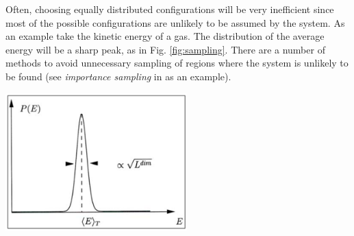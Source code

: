 \vspace{0.1cm}
\noindent
\begin{minipage}{\textwidth}
\begin{minipage}{.48\textwidth}
Often, choosing equally distributed configurations will be very inefficient since most of the possible configurations are unlikely to be assumed by the system. As an example take the kinetic energy of a gas. The distribution of the average energy will be a sharp peak, as in Fig. \ref{fig:sampling}. There are a number of methods to avoid unnecessary sampling of regions where the system is unlikely to be found (see \emph{importance sampling} in \citet{comp_phys} as an example).
\end{minipage}%
\hfill
\begin{minipage}{.48\textwidth}
  \centering
  \includegraphics[height=150pt]{pics/sampling}
  \label{fig:sampling}
\end{minipage}
\end{minipage}
\vspace{0.1cm}

